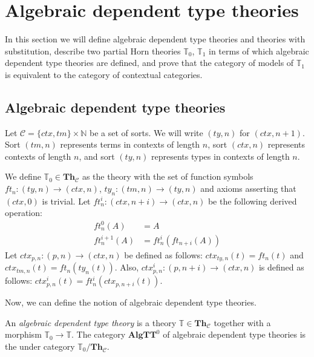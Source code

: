 \documentclass{elsarticle}
\theoremstyle{definition}
\theoremstyle{remark}
\newcommand{\cat}[1]{\mathbf{#1}}
\newcommand{\algtt}{\cat{AlgTT}}
\newcommand{\Th}{\cat{Th}}
\newcommand{\ThC}{\Th_{\mathcal{C}}}
\numberwithin{figure}{section}
\begin{document}
\section{Algebraic dependent type theories}
\label{sec:T1}

In this section we will define algebraic dependent type theories and theories with substitution, describe two partial Horn theories $\mathbb{T}_0$, $\mathbb{T}_1$
    in terms of which algebraic dependent type theories are defined, and prove that the category of models of $\mathbb{T}_1$ is equivalent to the category of contextual categories.

\subsection{Algebraic dependent type theories}

Let $\mathcal{C} = \{ ctx, tm \} \times \mathbb{N}$ be a set of sorts.
We will write $(ty,n)$ for $(ctx,n+1)$.
Sort $(tm,n)$ represents terms in contexts of length $n$, sort $(ctx,n)$ represents contexts of length $n$, and sort $(ty,n)$ represents types in contexts of length $n$.

We define $\mathbb{T}_0 \in \ThC$ as the theory with the set of function symbols $ft_n : (ty,n) \to (ctx,n)$, $ty_n : (tm,n) \to (ty,n)$ and axioms asserting that $(ctx,0)$ is trivial.
Let $ft^i_n : (ctx,n+i) \to (ctx,n)$ be the following derived operation:
\begin{align*}
ft^0_n(A) & = A \\
ft^{i+1}_n(A) & = ft^i_n(ft_{n+i}(A))
\end{align*}
Let $ctx_{p,n} : (p,n) \to (ctx,n)$ be defined as follows: $ctx_{ty,n}(t) = ft_n(t)$ and $ctx_{tm,n}(t) = ft_n(ty_n(t))$.
Also, $ctx^i_{p,n} : (p,n+i) \to (ctx,n)$ is defined as follows: $ctx^i_{p,n}(t) = ft^i_n(ctx_{p,n+i}(t))$.

Now, we can define the notion of algebraic dependent type theories.

\begin{defn}
An \emph{algebraic dependent type theory} is a theory $\mathbb{T} \in \ThC$ together with a morphism $\mathbb{T}_0 \to \mathbb{T}$.
The category $\algtt^0$ of algebraic dependent type theories is the under category $\mathbb{T}_0/\ThC$.
\end{defn}
\end{document}
